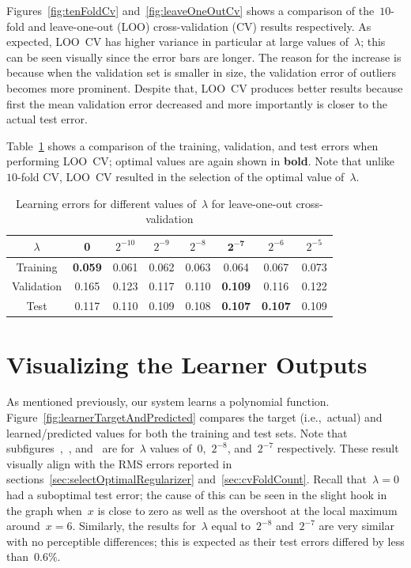 \documentclass{report}
\begin{document}
  Figures~\ref{fig:tenFoldCv} and~\ref{fig:leaveOneOutCv} shows a comparison of the~$10$-fold and leave-one-out (LOO) cross-validation (CV) results respectively.  As expected, LOO~CV has higher variance in particular at large values of~$\lambda$; this can be seen visually since the error bars are longer.  The reason for the increase is because when the validation set is smaller in size, the validation error of outliers becomes more prominent.  Despite that, LOO~CV produces better results because first the mean validation error decreased and more importantly is closer to the actual test error.
  
  Table~\ref{tab:lambdaLooError} shows a comparison of the training, validation, and test errors when performing LOO~CV; optimal values are again shown in \textbf{bold}.  Note that unlike $10$-fold CV, LOO~CV resulted in the selection of the optimal value of~$\lambda$.
  
   \begin{table}[tb]
    \centering
    \caption{Learning errors for different values of~$\lambda$ for leave-one-out cross-validation}\label{tab:lambdaLooError}
    \begin{tabular}{c||c|c|c|c|c|c|c}
      \hline
      $\lambda$  & 0     & $2^{-10}$ & $2^{-9}$ & $2^{-8}$ & $\mathbf{2^{-7}}$ & $2^{-6}$ & $2^{-5}$ \\ \hline\hline
      Training   & \textbf{0.059} & 0.061      & 0.062     & 0.063     & 0.064          & 0.067    & 0.073   \\ \hline
      Validation & 0.165          & 0.123      & 0.117     & 0.110     & \textbf{0.109} & 0.116    & 0.122   \\ \hline
      Test       & 0.117          & 0.110      & 0.109     & 0.108     & \textbf{0.107} & \textbf{0.107}    & 0.109   \\ \hline
    \end{tabular}
  \end{table}

  
  \section{Visualizing the Learner Outputs}
  
  As mentioned previously, our system learns a polynomial function.  Figure~\ref{fig:learnerTargetAndPredicted} compares the target (i.e.,~actual) and learned/predicted values for both the training and test sets.  Note that subfigures~,~, and~ are for~$\lambda$ values of~$0$,~$2^{-8}$, and~$2^{-7}$ respectively.  These result visually align with the RMS errors reported in sections~\ref{sec:selectOptimalRegularizer} and~\ref{sec:cvFoldCount}.  Recall that~${\lambda=0}$ had a suboptimal test error; the cause of this can be seen in the slight hook in the graph when~$x$ is close to zero as well as the overshoot at the local maximum around~${x=6}$.  Similarly, the results for~$\lambda$ equal to~$2^{-8}$ and~$2^{-7}$ are very similar with no perceptible differences; this is expected as their test errors differed by less than~$0.6\%$.
  
\end{document}
